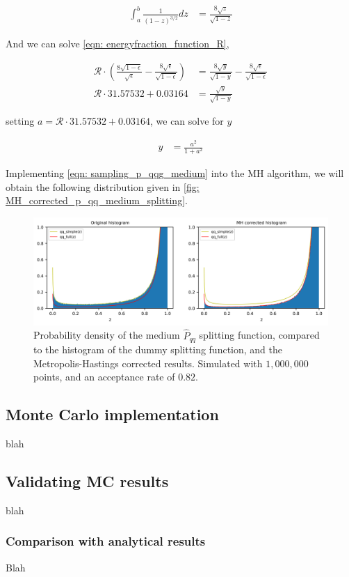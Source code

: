 \documentclass[main.tex]{subfiles}
\begin{document}
\begin{align}
    \int_a^b \frac{1}{(1-z)^{3/2}} dz &= \frac{8 \sqrt{z}}{\sqrt{1-z}}
\end{align}

And we can solve \autoref{eqn: energyfraction_function_R}, 

\begin{align}
    \mathcal{R} \cdot \left( \frac{8 \sqrt{1-\epsilon}}{\sqrt{\epsilon}} - \frac{8 \sqrt{\epsilon}}{\sqrt{1-\epsilon}} \right) &= \frac{8\sqrt{y}}{\sqrt{1-y}} - \frac{8\sqrt{\epsilon}}{\sqrt{1-\epsilon}} \nonumber\\
    \mathcal{R} \cdot 31.57532 + 0.03164  &= \frac{\sqrt{y}}{\sqrt{1-y}}
\end{align}

setting \(a = \mathcal{R} \cdot 31.57532 + 0.03164\), we can solve for \(y\)

\begin{align} \label{eqn: sampling_p_qqg_medium}
    y &= \frac{a^2}{1 + a^2} 
\end{align}

Implementing \autoref{eqn: sampling_p_qqg_medium} into the MH algorithm, we will obtain the following distribution given in \autoref{fig: MH_corrected_p_qq_medium_splitting}.

\begin{figure}[ht]
    \centering
    \includegraphics[width=14cm]{pictures/MH_plots/MH_medium_qq.png}
    \caption{Probability density of the medium \(\hat{P}_{qq}\) splitting function, compared to the histogram of the dummy splitting function, and the Metropolis-Hastings corrected results. Simulated with \(1,000,000\) points, and an acceptance rate of \(0.82\).}
    \label{fig: MH_corrected_p_qq_medium_splitting}
\end{figure}


\subsection{Monte Carlo implementation}
blah
\subsection{Validating MC results}
blah
\subsubsection{Comparison with analytical results}
Blah
\end{document}
